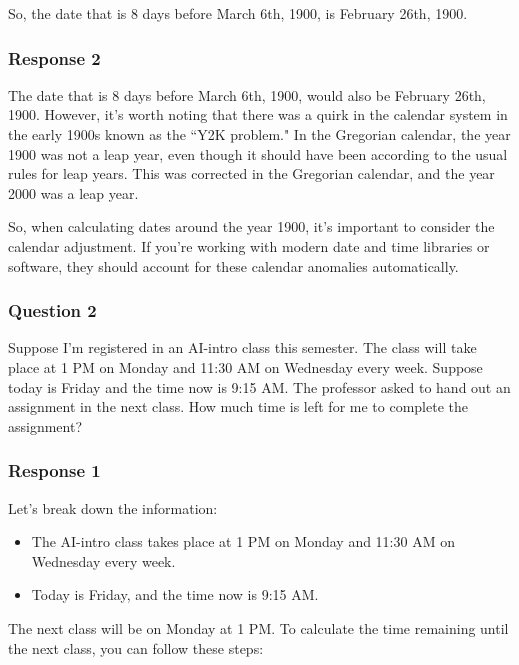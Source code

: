 \documentclass[12pt, a4paper]{article}
\begin{document}
So, the date that is 8 days before March 6th, 1900, is February 26th, 1900.

\subsubsection*{Response 2}

The date that is 8 days before March 6th, 1900, would also be February 26th, 1900. However, it's worth noting that there was a quirk in the calendar system in the early 1900s known as the ``Y2K problem." In the Gregorian calendar, the year 1900 was not a leap year, even though it should have been according to the usual rules for leap years. This was corrected in the Gregorian calendar, and the year 2000 was a leap year.

So, when calculating dates around the year 1900, it's important to consider the calendar adjustment. If you're working with modern date and time libraries or software, they should account for these calendar anomalies automatically.

\subsubsection*{Question 2}
Suppose I'm registered in an AI-intro class this semester. The class will take place at 1 PM on Monday and 11:30 AM on Wednesday every week. Suppose today is Friday and the time now is 9:15 AM. The professor asked to hand out an assignment in the next class. How much time is left for me to complete the assignment?

\subsubsection*{Response 1}
Let's break down the information:

\begin{itemize}
    \item The AI-intro class takes place at 1 PM on Monday and 11:30 AM on Wednesday every week.
    \item Today is Friday, and the time now is 9:15 AM.
\end{itemize}

The next class will be on Monday at 1 PM. To calculate the time remaining until the next class, you can follow these steps:
\end{document}
